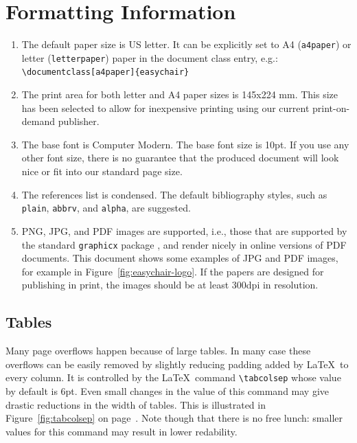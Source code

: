 \documentclass{easychair}
\begin{document}
\section{Formatting Information}
\label{sect:easychair-requirements}
\begin{enumerate}
	\item
	The default paper size is US letter. It can be explicitly set to A4 
	(\texttt{a4paper}) or letter (\texttt{letterpaper}) paper in the
	document class entry, e.g.:\\\verb+\documentclass[a4paper]{easychair}+
	
	\item
	The print area for both letter and A4 paper sizes is 145x224 mm. This size
	has been selected to allow for inexpensive printing using our current
	print-on-demand publisher.
	
	\item
	The base font is Computer Modern. The base font size is 10pt. If you
	use any other font size, there is no guarantee that the produced
	document will look nice or fit into our standard page size.
	
	\item
	The references list is condensed. The default bibliography styles, such as
	\texttt{plain}, \texttt{abbrv}, and \texttt{alpha}, are suggested.
	
	\item
	PNG, JPG, and PDF images are supported, i.e., those that are supported
	by the standard \texttt{graphicx} package \cite{graphicx-package}, and
	render nicely in online versions of PDF documents.  This document
	shows some examples of JPG and PDF images, for example in
	Figure~\ref{fig:easychair-logo}. If the papers are designed for
	publishing in print, the images should be at least 300dpi in
	resolution. 
	
\end{enumerate}

\subsection{Tables}

Many page overflows happen because of large tables. In many case these
overflows can be easily removed by slightly reducing padding added by
\LaTeX\ to every column. It is controlled by the \LaTeX\ command
\verb|\tabcolsep| whose value by default is 6pt. Even small changes in
the value of this command may give drastic reductions in the width of
tables. This is illustrated in Figure~\ref{fig:tabcolsep} on
page~\pageref{fig:tabcolsep}. Note though that there is no free lunch:
smaller values for this command may result in lower redability.
\end{document}
